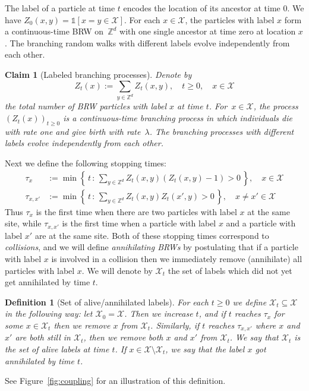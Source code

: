 \documentclass[a4paper,12pt]{article}
\newtheorem  {definition}    [theorem]{Definition}
\newtheorem  {claim}        [theorem]{Claim}
\newcommand{\Z}{\mathbb{Z}}
\begin{document}
The label of a particle at time $t$ encodes the location of its ancestor at time $0$.
We have $Z_0(x,y)=\mathds{1}[ x=y \in \mathcal{X} ]$. For each $x \in \mathcal{X}$, the particles with label $x$ form a continuous-time BRW on~$\Z^d$ with one single ancestor at time zero at location $x$. The branching random walks with different labels evolve independently from each other.

\begin{claim}[Labeled branching processes]\label{claim_brw_bp} Denote by
\begin{equation}\label{Z_T_x}
Z_t(x):= \sum_{y \in \mathbb{Z}^d } Z_t(x,y), \quad t \geq 0, \quad x \in \mathcal{X}
\end{equation}
the total number of BRW particles with label $x$ at time $t$.
 For~$x\in \mathcal{X}$, the process~$(Z_t(x))_{t \ge 0}$ is a continuous-time branching process in which individuals die with rate one and give birth with rate~$\lambda$.  The branching processes with different labels evolve independently from each other.
\end{claim}

Next we define the following stopping times:
\begin{align}
\label{crowd_x}
\tau_x  &:= \min \left\{ \, t \, : \, \sum\nolimits_{y \in \mathbb{Z}^d }   Z_t(x,y)(Z_t(x,y)-1)   >0   \,  \right\}, \quad x \in \mathcal{X} \\
\label{crowd_x_x_prime}
\tau_{x,x'}  &:= \min \left\{ \, t \, : \, \sum\nolimits_{y \in \mathbb{Z}^d }  Z_t(x,y)Z_t(x',y)  >0   \,  \right\}, \quad x \neq x' \in \mathcal{X}
\end{align}
Thus $\tau_x$ is the first time when there are two particles with label $x$ at the same site, while $\tau_{x,x'}$ is the first time when a particle with label
$x$ and a particle with label $x'$ are at the same site. Both of these stopping times correspond to \emph{collisions}, and we will define \emph{annihilating BRWs}
by postulating that if a particle with label $x$ is involved in a collision then we immediately remove (annihilate) all particles with label $x$.
 We will denote by $\mathcal{X}_t$ the set of labels which did not yet get annihilated by time $t$.


\begin{definition}[Set of alive/annihilated labels]
\label{def_mathcal_X_t} For each $t \geq 0$  we define $\mathcal{X}_t \subseteq \mathcal{X}$ in the following way: let $\mathcal{X}_0=\mathcal{X}$. Then we increase $t$, and if $t$ reaches $\tau_x$ for some $x \in \mathcal{X}_t$ then we  remove $x$ from $\mathcal{X}_t$. Similarly, if $t$ reaches $\tau_{x,x'}$ where $x$ and $x'$ are both still in $\mathcal{X}_t$, then we remove both $x$ and $x'$ from $\mathcal{X}_t$. We say that $\mathcal{X}_t$ is the set of alive labels at time $t$. If $x \in \mathcal{X} \setminus \mathcal{X}_t$, we say that the label $x$ got annihilated by time $t$.
\end{definition}
See Figure~\ref{fig:coupling} for an illustration of this definition.
\end{document}
